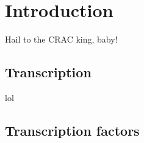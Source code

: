 \documentclass{Thesis}
\begin{document}
\listoftodos
\frontmatter

\part{Introduction}

\begin{savequote}[70mm]
Hail to the CRAC king, baby!
\end{savequote}

\chapter{Transcription}


	
	
	
	

\begin{savequote}[70mm]
lol
\end{savequote}

\chapter{Transcription factors}


	
	
	


%
%
%



\singlespacing


\end{document}

